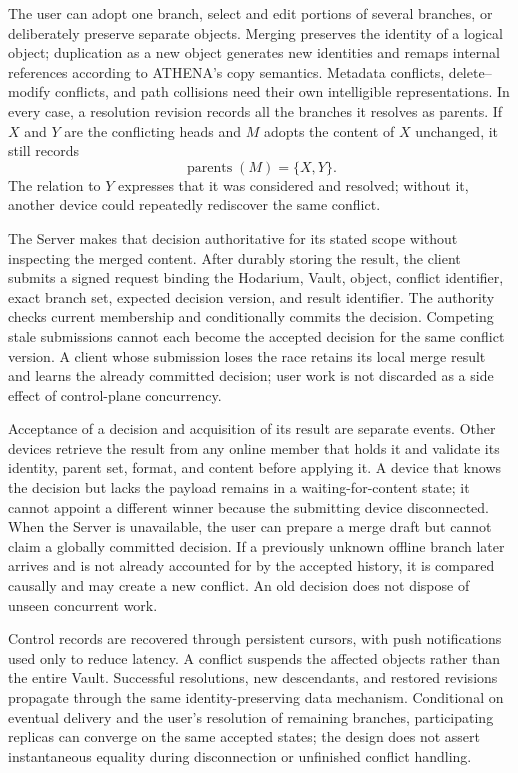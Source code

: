 \documentclass[11pt,a4paper]{article}
\theoremstyle{definition}
\theoremstyle{plain}
\begin{document}
The user can adopt one branch, select and edit portions of several
branches, or deliberately preserve separate objects. Merging preserves
the identity of a logical object; duplication as a new object generates
new identities and remaps internal references according to ATHENA's
copy semantics. Metadata conflicts, delete--modify conflicts, and
path collisions need their own intelligible representations. In every
case, a resolution revision records all the branches it resolves as
parents. If $X$ and $Y$ are the conflicting heads and $M$ adopts the
content of $X$ unchanged, it still records
\[
 \operatorname{parents}(M)=\{X,Y\}.
\]
The relation to $Y$ expresses that it was considered and resolved;
without it, another device could repeatedly rediscover the same conflict.

The Server makes that decision authoritative for its stated scope
without inspecting the merged content. After durably storing the result,
the client submits a signed request binding the Hodarium, Vault, object,
conflict identifier, exact branch set, expected decision version, and
result identifier. The authority checks current membership and
conditionally commits the decision. Competing stale submissions cannot
each become the accepted decision for the same conflict version.
A client whose submission loses the race retains its local merge result
and learns the already committed decision; user work is not discarded
as a side effect of control-plane concurrency.

Acceptance of a decision and acquisition of its result are separate
events. Other devices retrieve the result from any online member that
holds it and validate its identity, parent set, format, and content
before applying it. A device that knows the decision but lacks the
payload remains in a waiting-for-content state; it cannot appoint a
different winner because the submitting device disconnected. When the
Server is unavailable, the user can prepare a merge draft but cannot
claim a globally committed decision. If a previously unknown offline
branch later arrives and is not already accounted for by the accepted
history, it is compared causally and may create a new conflict. An old
decision does not dispose of unseen concurrent work.

Control records are recovered through persistent cursors, with push
notifications used only to reduce latency. A conflict suspends the
affected objects rather than the entire Vault. Successful resolutions,
new descendants, and restored revisions propagate through the same
identity-preserving data mechanism. Conditional on eventual delivery
and the user's resolution of remaining branches, participating replicas
can converge on the same accepted states; the design does not assert
instantaneous equality during disconnection or unfinished conflict
handling.
\end{document}

